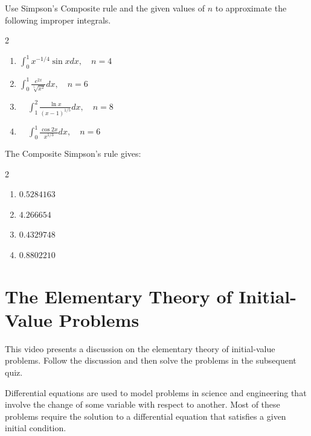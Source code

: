 \begin{myexercise}%
Use Simpson's Composite rule and the given values of $n$ to approximate the following improper integrals.
\begin{multicols}{2}
\begin{enumerate}[label=(\alph*)]
\item $\int_{0}^{1} x^{-1 / 4} \sin x d x, \quad n=4$\\
\item $\int_{0}^{1} \frac{e^{2 x}}{\sqrt[5]{x^{2}}} d x, \quad n=6$
\item $\quad \int_{1}^{2} \frac{\ln x}{(x-1)^{1 / 5}} d x, \quad n=8$\\
\item $\quad \int_{0}^{1} \frac{\cos 2 x}{x^{1 / 3}} d x, \quad n=6$
\end{enumerate}
\end{multicols}

\begin{mysolution}
The Composite Simpson’s rule gives:
\begin{multicols}{2}
\begin{enumerate}[label=(\alph*)]
\item $0.5284163$
\item $4.266654$
\item $0.4329748$
\item $0.8802210$
\end{enumerate}
\end{multicols}
\end{mysolution}
\end{myexercise}



\section{The Elementary Theory of Initial-Value Problems}
\videolesson
\begin{selfvideo}[2]
This video presents a discussion on the elementary theory of initial-value problems. Follow the discussion and then solve the problems in the subsequent quiz.
\end{selfvideo}
Differential equations are used to model problems in science and engineering that involve the change of some variable with respect to another. Most of these problems require the solution to a differential equation that satisfies a given initial condition.

